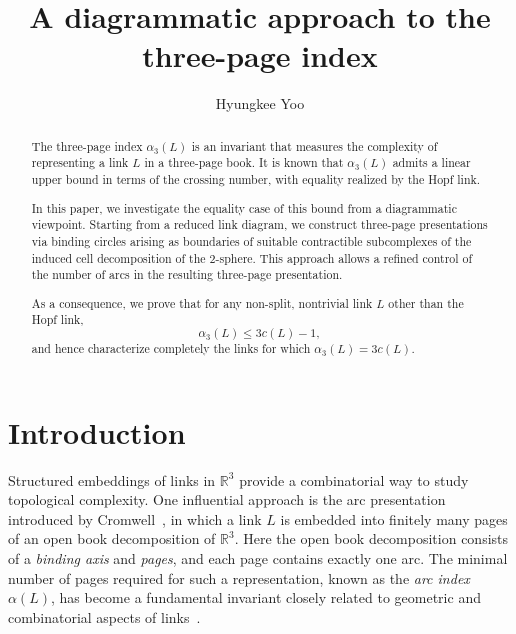 \documentclass[11pt,a4paper]{amsart}
\begin{document}
	
\title{A diagrammatic approach to the three-page index}
	
\author[H. Yoo]{Hyungkee Yoo}
\address{Department of Mathematics Education, Sunchon National University, Sunchon 57922, Korea}
	
\begin{abstract}
The three-page index $\alpha_3(L)$ is an invariant that measures the complexity
of representing a link $L$ in a three-page book.
It is known that $\alpha_3(L)$ admits a linear upper bound in terms of the crossing number,
with equality realized by the Hopf link.

In this paper, we investigate the equality case of this bound from a diagrammatic viewpoint.
Starting from a reduced link diagram, we construct three-page presentations
via binding circles arising as boundaries of suitable contractible subcomplexes
of the induced cell decomposition of the $2$-sphere.
This approach allows a refined control of the number of arcs
in the resulting three-page presentation.

As a consequence, we prove that for any non-split, nontrivial link $L$
other than the Hopf link,
\[
\alpha_3(L)\le 3c(L)-1,
\]
and hence characterize completely the links for which
$\alpha_3(L)=3c(L)$.
\end{abstract}



	
\maketitle
\section{Introduction} \label{sec:intro}

Structured embeddings of links in $\mathbb{R}^3$ provide a combinatorial way to study topological complexity.
One influential approach is the arc presentation introduced by Cromwell~\cite{Cr}, in which a link $L$ is embedded into finitely many pages of an open book decomposition of $\mathbb{R}^3$.
Here the open book decomposition consists of a \textit{binding axis} and \textit{pages}, and each page contains exactly one arc.
The minimal number of pages required for such a representation, known as the \textit{arc index} $\alpha(L)$, has become a fundamental invariant closely related to geometric and combinatorial aspects of links~\cite{BP,Cr2,CrNut,Mat,MB,Ng}.
\end{document}
